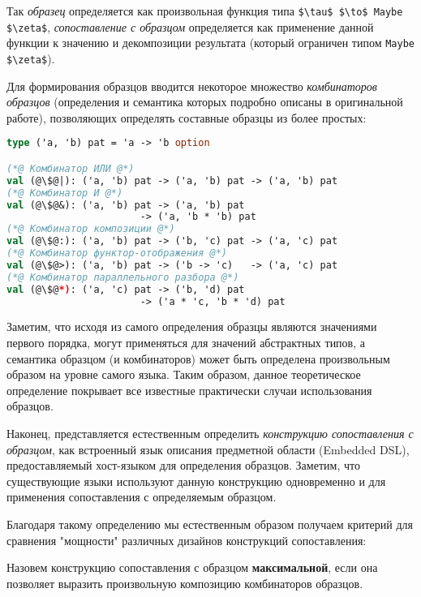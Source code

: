 Так \textit{образец} определяется как произвольная функция типа \linebreak \lstinline|$\tau$ $\to$ Maybe $\zeta$|, \textit{сопоставление с образцом} определяется как применение данной функции к значению и декомпозиции результата (который ограничен типом \lstinline|Maybe $\zeta$|). 

Для формирования образцов вводится некоторое множество \textit{комбинаторов образцов} (определения и семантика которых подробно описаны в оригинальной работе), позволяющих определять составные образцы из более простых:

\noindent
\begin{minipage}{\linewidth}
\begin{lstlisting}[language=ocaml, escapechar=@]
type ('a, 'b) pat = 'a -> 'b option

(*@ Комбинатор ИЛИ @*)
val (@\$@|): ('a, 'b) pat -> ('a, 'b) pat -> ('a, 'b) pat
(*@ Комбинатор И @*)
val (@\$@&): ('a, 'b) pat -> ('a, 'b) pat 
                       -> ('a, 'b * 'b) pat
(*@ Комбинатор композиции @*)
val (@\$@:): ('a, 'b) pat -> ('b, 'c) pat -> ('a, 'c) pat
(*@ Комбинатор функтор-отображения @*)
val (@\$@>): ('a, 'b) pat -> ('b -> 'c)   -> ('a, 'c) pat
(*@ Комбинатор параллельного разбора @*)
val (@\$@*): ('a, 'c) pat -> ('b, 'd) pat 
                       -> ('a * 'c, 'b * 'd) pat
\end{lstlisting}
\end{minipage}

Заметим, что исходя из самого определения образцы являются значениями первого порядка, могут применяться для значений абстрактных типов, а семантика образцом (и комбинаторов) может быть определена произвольным образом на уровне самого языка. Таким образом, данное теоретическое определение покрывает все известные практически случаи использования образцов.

Наконец, представляется естественным определить \textit{конструкцию сопоставления с образцом}, как встроенный язык описания предметной области (Embedded DSL), предоставляемый хост-языком для определения образцов. Заметим, что существующие языки используют данную конструкцию одновременно и для применения сопоставления с определяемым образцом. 

Благодаря такому определению мы естественным образом получаем критерий для сравнения "мощности" различных дизайнов конструкций сопоставления:

\begin{definition}[Максимальность]
Назовем конструкцию сопоставления с образцом \textbf{максимальной}, если она позволяет выразить произвольную композицию комбинаторов образцов.
\end{definition}

